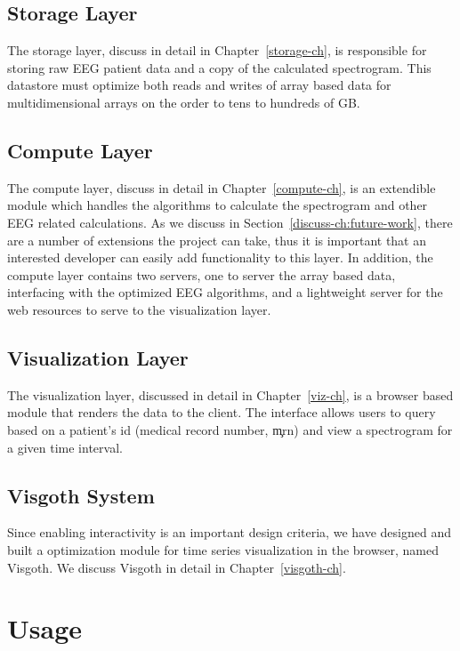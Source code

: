 \subsection{Storage Layer}

The storage layer, discuss in detail in Chapter~\ref{storage-ch}, is
responsible for storing raw EEG patient data and a copy of the calculated
spectrogram. This datastore must optimize both reads and writes of array based
data for multidimensional arrays on the order to tens to hundreds of GB.

\subsection{Compute Layer}

The compute layer, discuss in detail in Chapter~\ref{compute-ch}, is an
extendible module which handles the algorithms to calculate the spectrogram and
other EEG related calculations. As we discuss in
Section~\ref{discuss-ch:future-work}, there are a number of extensions the
project can take, thus it is important that an interested developer can easily
add functionality to this layer. In addition, the compute layer contains two
servers, one to server the array based data, interfacing with the optimized EEG
algorithms, and a lightweight server for the web resources to serve to the
visualization layer.

\subsection{Visualization Layer}

The visualization layer, discussed in detail in Chapter~\ref{viz-ch}, is a browser
based module that renders the data to the client. The interface allows users to
query based on a patient's id (medical record number, \c{mrn}) and view a spectrogram
for a given time interval.

\subsection{Visgoth System}

Since enabling interactivity is an important design criteria, we have designed
and built a optimization module for time series visualization in the browser,
named Visgoth. We discuss Visgoth in detail in Chapter~\ref{visgoth-ch}.

\section{Usage}

